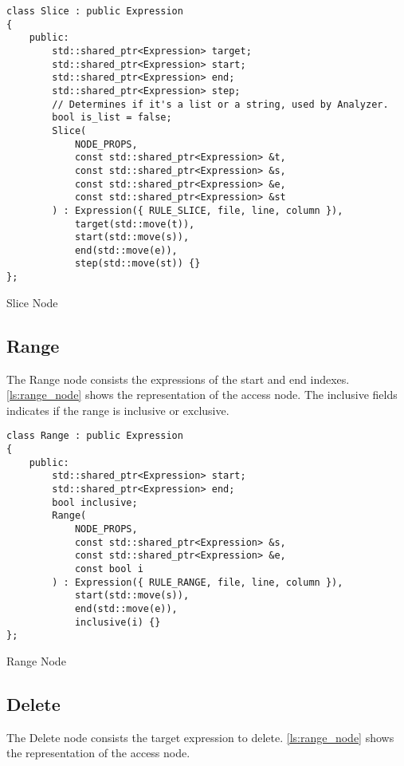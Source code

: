 \begin{listing}[H]
\begin{verbatim}
class Slice : public Expression
{
    public:
        std::shared_ptr<Expression> target;
        std::shared_ptr<Expression> start;
        std::shared_ptr<Expression> end;
        std::shared_ptr<Expression> step;
        // Determines if it's a list or a string, used by Analyzer.
        bool is_list = false;
        Slice(
            NODE_PROPS,
            const std::shared_ptr<Expression> &t,
            const std::shared_ptr<Expression> &s,
            const std::shared_ptr<Expression> &e,
            const std::shared_ptr<Expression> &st
        ) : Expression({ RULE_SLICE, file, line, column }),
            target(std::move(t)),
            start(std::move(s)),
            end(std::move(e)),
            step(std::move(st)) {}
};
\end{verbatim}
\caption{Slice Node}
\label{ls:slice_node}
\end{listing}

\subsection{Range}

The Range node consists the expressions of the start and end indexes.
\autoref{ls:range_node} shows the representation of the access node.
The inclusive fields indicates if the range is inclusive or exclusive.

\begin{listing}[H]
\begin{verbatim}
class Range : public Expression
{
    public:
        std::shared_ptr<Expression> start;
        std::shared_ptr<Expression> end;
        bool inclusive;
        Range(
            NODE_PROPS,
            const std::shared_ptr<Expression> &s,
            const std::shared_ptr<Expression> &e,
            const bool i
        ) : Expression({ RULE_RANGE, file, line, column }),
            start(std::move(s)),
            end(std::move(e)),
            inclusive(i) {}
};
\end{verbatim}
\caption{Range Node}
\label{ls:range_node}
\end{listing}

\subsection{Delete}

The Delete node consists the target expression to delete.
\autoref{ls:range_node} shows the representation of the access node.

